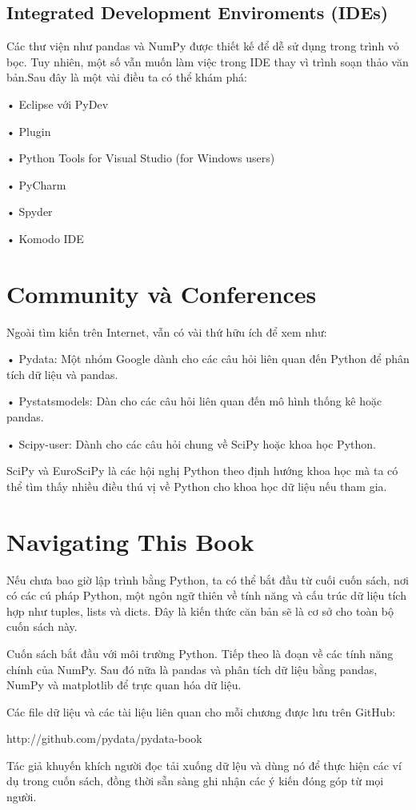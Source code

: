 \subsection{Integrated Development Enviroments (IDEs)}\par
\quad Các thư viện như pandas và NumPy được thiết kế để dễ sử dụng trong trình vỏ bọc. Tuy nhiên, một số vẫn muốn làm việc trong IDE thay vì trình soạn thảo văn bản.Sau đây là một vài điều ta có thể khám phá:\par
• Eclipse với PyDev\par 
• Plugin\par
• Python Tools for Visual Studio (for Windows users)\par
• PyCharm\par
• Spyder\par
• Komodo IDE\par
\section{Community và Conferences}\par
\quad Ngoài tìm kiến trên Internet, vẫn có vài thứ hữu ích để xem như:\par
• Pydata: Một nhóm Google dành cho các câu hỏi liên quan đến Python để phân tích dữ liệu và pandas.\par
• Pystatsmodels: Dàn cho các câu hỏi liên quan đến mô hình thống kê hoặc pandas.\par
• Scipy-user: Dành cho các câu hỏi chung về SciPy hoặc khoa học Python.\par
SciPy và EuroSciPy là các hội nghị Python theo định hướng khoa học mà ta có thể tìm thấy nhiều điều thú vị về Python cho khoa học dữ liệu nếu tham gia.
\section{Navigating This Book}
\quad Nếu chưa bao giờ lập trình bằng Python, ta có thể bắt đầu từ cuối cuốn sách, nơi có các cú pháp Python, một ngôn ngữ thiên về tính năng và cấu trúc dữ liệu tích hợp như tuples, lists và dicts. Đây là kiến thức căn bản sẽ là cơ sở cho toàn bộ cuốn sách này.\par
Cuốn sách bắt đầu với môi trường Python. Tiếp theo là đoạn về các tính năng chính của NumPy. Sau đó nữa là pandas và phân tích dữ liệu bằng pandas, NumPy và matplotlib để trực quan hóa dữ liệu.\par
Các file dữ liệu và các tài liệu liên quan cho mỗi chương được lưu trên GitHub: \par http://github.com/pydata/pydata-book\par
Tác giả khuyến khích người đọc tải xuống dữ lệu và dùng nó để thực hiện các ví dụ trong cuốn sách, đồng thời sẵn sàng ghi nhận các ý kiến đóng góp từ mọi người.\par
